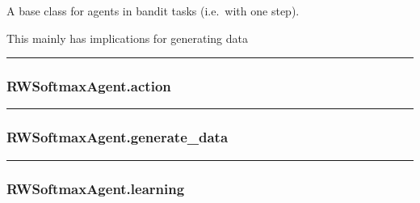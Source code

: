 \begin{Shaded}
\begin{Highlighting}[]
\end{Highlighting}
\end{Shaded}

A base class for agents in bandit tasks (i.e.~with one step).

This mainly has implications for generating data

\begin{center}\rule{0.5\linewidth}{\linethickness}\end{center}

\hypertarget{rwsoftmaxagent.action}{%
\subsubsection{RWSoftmaxAgent.action}\label{rwsoftmaxagent.action}}

\begin{Shaded}
\begin{Highlighting}[]
\end{Highlighting}
\end{Shaded}

\begin{center}\rule{0.5\linewidth}{\linethickness}\end{center}

\hypertarget{rwsoftmaxagent.generate_data}{%
\subsubsection{RWSoftmaxAgent.generate\_data}\label{rwsoftmaxagent.generate_data}}

\begin{Shaded}
\begin{Highlighting}[]
\end{Highlighting}
\end{Shaded}

\begin{center}\rule{0.5\linewidth}{\linethickness}\end{center}

\hypertarget{rwsoftmaxagent.learning}{%
\subsubsection{RWSoftmaxAgent.learning}\label{rwsoftmaxagent.learning}}

